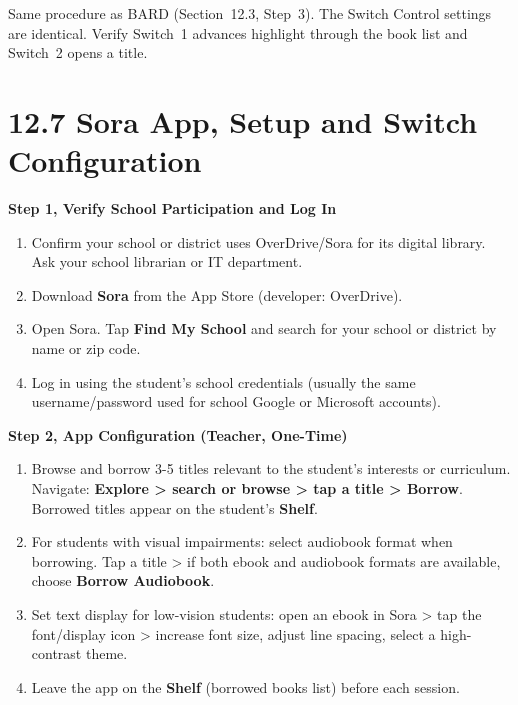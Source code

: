 \documentclass[justified,openright]{tufte-book}
\begin{document}
Same procedure as BARD (Section~12.3, Step~3). The Switch Control
settings are identical. Verify Switch~1 advances highlight through the
book list and Switch~2 opens a title.


\section{12.7 Sora App, Setup and Switch
Configuration}\label{sora-setup}


\textbf{Step 1, Verify School Participation and Log In}

\begin{enumerate}
\item
  Confirm your school or district uses OverDrive/Sora for its digital
  library. Ask your school librarian or IT department.
\item
  Download \textbf{Sora} from the App Store (developer: OverDrive).
\item
  Open Sora. Tap \textbf{Find My School} and search for your school or
  district by name or zip code.
\item
  Log in using the student's school credentials (usually the same
  username/password used for school Google or Microsoft accounts).
\end{enumerate}

\textbf{Step 2, App Configuration (Teacher, One-Time)}

\begin{enumerate}
\item
  Browse and borrow 3-5 titles relevant to the student's interests or
  curriculum. Navigate: \textbf{Explore \textgreater{} search or browse
  \textgreater{} tap a title \textgreater{} Borrow}. Borrowed titles
  appear on the student's \textbf{Shelf}.
\item
  For students with visual impairments: select audiobook format when
  borrowing. Tap a title \textgreater{} if both ebook and audiobook
  formats are available, choose \textbf{Borrow Audiobook}.
\item
  Set text display for low-vision students: open an ebook in Sora
  \textgreater{} tap the font/display icon \textgreater{} increase font
  size, adjust line spacing, select a high-contrast theme.
\item
  Leave the app on the \textbf{Shelf} (borrowed books list) before each
  session.
\end{enumerate}
\end{document}
